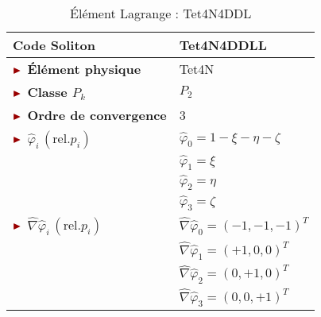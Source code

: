 \begin{table}[H]
	\begin{minipage}[t]{0.48\linewidth}
		\centering
		\begin{tabular}{>{\bfseries} l|l}
			\toprule %
			\rowcolor{black!10}\rowstyle{\color{MyRed}\bfseries} Code Soliton & \textcolor{MyRed}{\textbf{Tet4N4DDLL}}\\
			\midrule
			$\mytriangle$ Élément physique & \textcolor{MyRed}{Tet4N}\\
			$\mytriangle$ Classe $P_k$ & $P_2$\\
			$\mytriangle$ Ordre de convergence & 3\\
			\midrule
			$\mytriangle$ $\widehat{\varphi}_i\, (\text{rel.} p_i)$ &  $\widehat{\varphi}_0 = 1-\xi-\eta-\zeta$\\
			&  $\widehat{\varphi}_1 = \xi$\\
			&  $\widehat{\varphi}_2 = \eta$\\
			&  $\widehat{\varphi}_3 = \zeta$\\
			\midrule
			$\mytriangle$ $\widehat{\nabla}\widehat{\varphi}_i\, (\text{rel.} p_i)$ & $\widehat{\nabla}\widehat{\varphi}_0 =  \left(-1, -1, -1\right)^T$ \\
			& $\widehat{\nabla}\widehat{\varphi}_1 = \left(+1, 0, 0\right)^T$ \\
			& $\widehat{\nabla}\widehat{\varphi}_2 = \left(0, +1, 0\right)^T$ \\
			& $\widehat{\nabla}\widehat{\varphi}_3 = \left(0, 0, +1\right)^T$ \\
			\bottomrule %
		\end{tabular}
		\caption{Élément Lagrange : Tet4N4DDL}
		\label{tab:Tet4N4DDL}
	\end{minipage}\hfill
\end{table}

